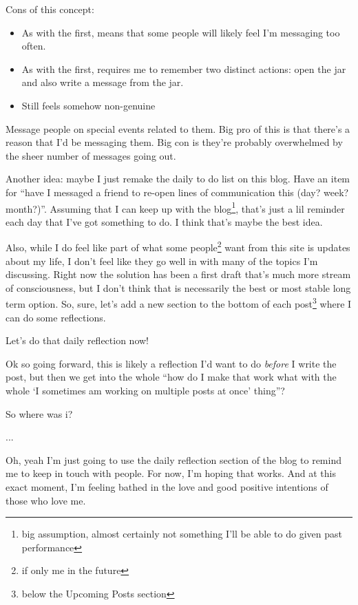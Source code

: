 \documentclass[12pt]{article}
\newcommand{\say}[1]{``#1''}
\newcommand{\nsay}[1]{`#1'}
\renewcommand{\,}{\textsuperscript{,}}
\begin{document}
Cons of this concept:

\begin{itemize}  
\item As with the first, means that some people will likely feel I'm messaging too often.  
\item As with the first, requires me to remember two distinct actions: open the jar and also write a message from the jar.  
\item Still feels somehow non-genuine  
\end{itemize}

Message people on special events related to them. Big pro of this is that there's a reason that I'd be messaging them. Big con is they're probably overwhelmed by the sheer number of messages going out.

Another idea: maybe I just remake the daily to do list on this blog. Have an item for \say{have I messaged a friend to re-open lines of communication this (day? week? month?)}.  
Assuming that I can keep up with the blog\footnote{big assumption, almost certainly not something I'll be able to do given past performance}, that's just a lil reminder each day that I've got something to do.  
I think that's maybe the best idea.

Also, while I do feel like part of what some people\footnote{if only me in the future} want from this site is updates about my life, I don't feel like they go well in with many of the topics I'm discussing.  
Right now the solution has been a first draft that's much more stream of consciousness, but I don't think that is necessarily the best or most stable long term option.  
So, sure, let's add a new section to the bottom of each post\footnote{below the Upcoming Posts section} where I can do some reflections.

Let's do that daily reflection now!

Ok so going forward, this is likely a reflection I'd want to do \textit{before} I write the post, but then we get into the whole \say{how do I make that work what with the whole \nsay{I sometimes am working on multiple posts at once} thing}?

So where was i?

...

Oh, yeah I'm just going to use the daily reflection section of the blog to remind me to keep in touch with people.  
For now, I'm hoping that works.  
And at this exact moment, I'm feeling bathed in the love and good positive intentions of those who love me.
\end{document}
